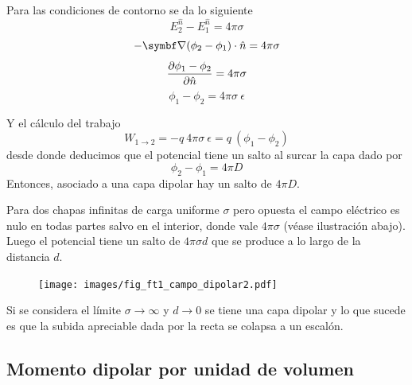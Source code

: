 \documentclass[10pt,oneside]{CBFT_book}
\begin{document}
Para las condiciones de contorno se da lo siguiente
\[
	E_2^{\hat{n}} - E_1^{\hat{n}} = 4\pi\sigma
\]
\[
	- \Nabla (\phi_2 - \phi_1)\cdot \hat{n} = 4\pi\sigma
\]
\[
	\frac{\partial^{\hspace{-0.05em}} {\phi_1 - \phi_2}}{\partial {\hat{n}}^{\hspace{-0.05em}}} = 4\pi\sigma
\]
\[
	\phi_1 - \phi_2 = 4\pi\sigma\:\epsilon
\]

Y el cálculo del trabajo
\[
	W_{1\to 2} = - q \: 4 \pi \sigma \:\epsilon = q\:( \phi_1 - \phi_2 )
\]
desde donde deducimos que el potencial tiene un salto al surcar la capa dado por 
\[
	\phi_2 - \phi_1 = 4\pi D
\]
Entonces, asociado a una capa dipolar hay un salto de $4\pi D$.


Para dos chapas infinitas de carga uniforme $\sigma$ pero opuesta el campo eléctrico es nulo 
en todas partes salvo en el interior, donde vale $4\pi\sigma$ (véase ilustración abajo).
Luego el potencial tiene un salto de $4\pi\sigma d$ que se produce a lo largo de la distancia
$d$.

\begin{figure}[htb]
	\begin{center}
	\texttt{[image: images/fig\_ft1\_campo\_dipolar2.pdf]}	 
	\end{center}
	\caption{}
\end{figure}

Si se considera el límite $\sigma \to \infty$ y $d\to 0$ se tiene una capa dipolar y lo 
que sucede es que la subida apreciable dada por la recta se colapsa a un escalón.


\subsection{Momento dipolar por unidad de volumen}
\end{document}
